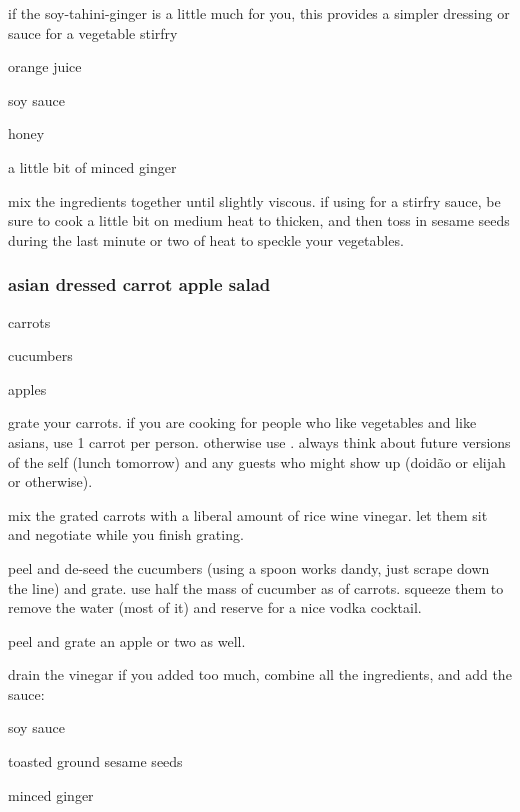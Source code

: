 if the soy-tahini-ginger is a little much for you, this provides a simpler 
dressing or sauce for a vegetable stirfry


\begin{ingredients}
  \item orange juice
  \item soy sauce
  \item honey
  \item a little bit of minced ginger
\end{ingredients}

mix the ingredients together until slightly viscous. if using for a stirfry 
sauce, be sure to cook a little bit on medium heat to thicken, and then toss 
in sesame seeds during the last minute or two of heat to speckle your 
vegetables.

\subsubsection{asian dressed carrot apple salad}

\begin{ingredients}
  \item carrots
  \item cucumbers
  \item apples
\end{ingredients}

grate your carrots. if you are cooking for people who like vegetables and like 
asians, use 1 carrot per person. otherwise use \onehalf. always think about 
future versions of the self (lunch tomorrow) and any guests who might show up 
(doid\~{a}o or elijah or otherwise).

mix the grated carrots with a liberal amount of rice wine vinegar. let them 
sit and negotiate while you finish grating.

peel and de-seed the cucumbers (using a spoon works dandy, just scrape down 
the line) and grate. use half the mass of cucumber as of carrots. squeeze them 
to remove the water (most of it) and reserve for a nice vodka cocktail. 

peel and grate an apple or two as well.

drain the vinegar if you added too much, combine all the ingredients, and add 
the sauce:

\begin{ingredients}
  \item soy sauce
  \item toasted ground sesame seeds
  \item minced ginger
\end{ingredients}

